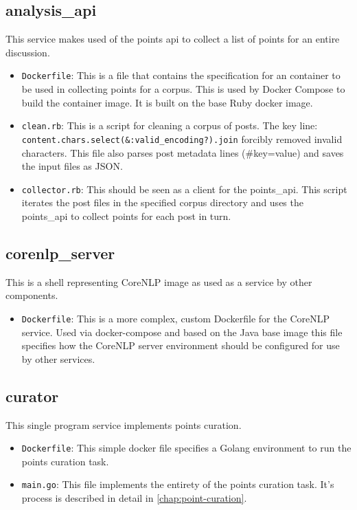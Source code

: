 \subsection*{analysis\_api}
  This service makes used of the points api to collect a list of points for an entire discussion.
  \begin{itemize}
    \item
      \texttt{Dockerfile}: This is a file that contains the specification for an container to be used in collecting points for a corpus. This is used by Docker Compose to build the container image. It is built on the base Ruby docker image.
    \item
      \texttt{clean.rb}: This is a script for cleaning a corpus of posts. The key line: \texttt{content.chars.select(\&:valid\_encoding?).join} forcibly removed invalid characters. This file also parses post metadata lines (\#key=value) and saves the input files as JSON.
    \item
      \texttt{collector.rb}: This should be seen as a client for the points\_api. This script iterates the post files in the specified corpus directory and uses the points\_api to collect points for each post in turn.
  \end{itemize}

\subsection*{corenlp\_server}
  This is a shell representing CoreNLP image as used as a service by other components.
  \begin{itemize}
    \item
      \texttt{Dockerfile}: This is a more complex, custom Dockerfile for the CoreNLP service. Used via docker-compose and based on the Java base image this file specifies how the CoreNLP server environment should be configured for use by other services.
  \end{itemize}

\subsection*{curator}
  This single program service implements points curation.
  \begin{itemize}
    \item
      \texttt{Dockerfile}: This simple docker file specifies a Golang environment to run the points curation task.
    \item
      \texttt{main.go}: This file implements the entirety of the points curation task. It's process is described in detail in \ref{chap:point-curation}.
  \end{itemize}

